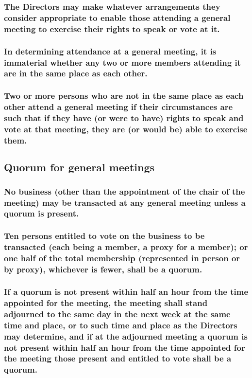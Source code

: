 \documentclass[12pt]{article}
\begin{document}
\subsubsection{The Directors may make whatever arrangements they consider appropriate to enable those attending a general meeting to exercise their rights to speak or vote at it.}
\subsubsection{In determining attendance at a general meeting, it is immaterial whether any two or more members attending it are in the same place as each other.}
\subsubsection{Two or more persons who are not in the same place as each other attend a general meeting if their circumstances are such that if they have (or were to have) rights to speak and vote at that meeting, they are (or would be) able to exercise them.}

\subsection{Quorum for general meetings}
\subsubsection{No business (other than the appointment of the chair of the meeting) may be transacted at any general meeting unless a quorum is present.}
\subsubsection{Ten persons entitled to vote on the business to be transacted (each being a member, a proxy for a member); or one half of the total membership (represented in person or by proxy), whichever is fewer, shall be a quorum.}
\subsubsection{If a quorum is not present within half an hour from the time appointed for the meeting, the meeting shall stand adjourned to the same day in the next week at the same time and place, or to such time and place as the Directors may determine, and if at the adjourned meeting a quorum is not present within half an hour from the time appointed for the meeting those present and entitled to vote shall be a quorum.}
\end{document}
